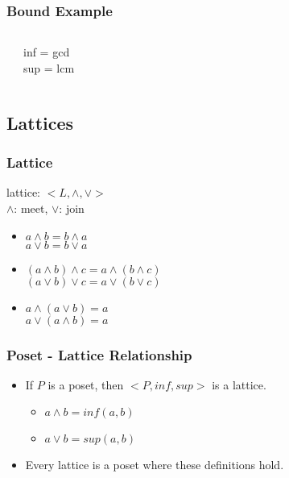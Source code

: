 \documentclass[dvipsnames]{beamer}
\begin{document}
\begin{frame}
  \frametitle{Bound Example}

  \begin{example}[factors of 36]
    \begin{columns}
      \begin{center}
      \end{center}

      inf = gcd\\
      sup = lcm
    \end{columns}
  \end{example}
\end{frame}

\subsection{Lattices}

\begin{frame}
  \frametitle{Lattice}

  \begin{definition}
    \alert{lattice}: $<L,\wedge,\vee>$\\
    $\wedge$: meet, $\vee$: join

    \pause
    \begin{itemize}
      \item $a \wedge b = b \wedge a$\\
        $a \vee b = b \vee a$
      \item$(a \wedge b) \wedge c = a \wedge (b \wedge c)$\\
        $(a \vee b) \vee c = a \vee (b \vee c)$
      \item $a \wedge (a \vee b) = a$\\
        $a \vee (a \wedge b) = a$
    \end{itemize}
  \end{definition}
\end{frame}

\begin{frame}
  \frametitle{Poset - Lattice Relationship}

  \begin{itemize}
    \item If $P$ is a poset, then $<P,inf,sup>$ is a lattice.
    \begin{itemize}
      \item $a \wedge b = inf(a,b)$
      \item $a \vee b = sup(a,b)$
    \end{itemize}

    \pause
    \medskip
    \item Every lattice is a poset where these definitions hold.
  \end{itemize}
\end{frame}
\end{document}
